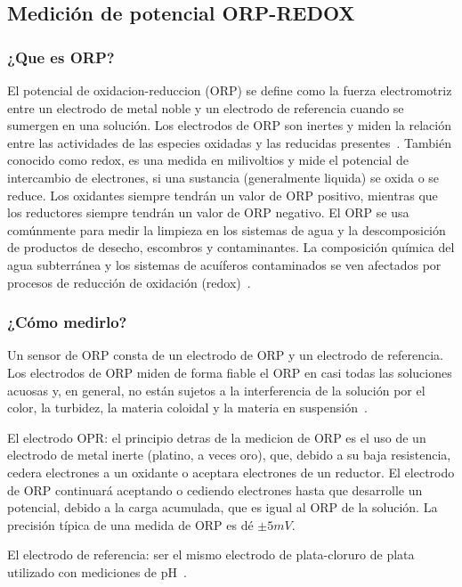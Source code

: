 \subsection{Medición de potencial ORP-REDOX}
\subsubsection{¿Que es ORP?}
El potencial de oxidacion-reduccion (ORP) se define como la fuerza electromotriz entre un electrodo de metal noble y un electrodo de referencia cuando se sumergen en una solución.
Los electrodos de ORP son inertes y miden la relación entre las actividades de las especies oxidadas y las reducidas presentes~\cite{d19_committee_test_nodate}.
También conocido como redox, es una medida en milivoltios y mide el potencial de intercambio de electrones, si una sustancia (generalmente liquida) se oxida o se reduce. 
Los oxidantes siempre tendrán un valor de ORP positivo, mientras que los reductores siempre tendrán un valor de ORP negativo. 
El ORP se usa comúnmente para medir la limpieza en los sistemas de agua y la descomposición de productos de desecho, escombros y contaminantes. 
La composición química del agua subterránea y los sistemas de acuíferos contaminados se ven afectados por procesos de reducción de oxidación (redox)~\cite{wator_redox_2020}.

\subsubsection{¿Cómo medirlo?}
Un sensor de ORP consta de un electrodo de ORP y un electrodo de referencia.
Los electrodos de ORP miden de forma fiable el ORP en casi todas las soluciones acuosas y, en general, no están sujetos a la interferencia de la solución por el color, la turbidez, la materia coloidal y la materia en suspensión~\cite{d19_committee_test_nodate}.

El electrodo OPR: el principio detras de la medicion de ORP es el uso de un electrodo de metal inerte (platino, a veces oro), que, debido a su baja resistencia, cedera electrones a un oxidante o aceptara electrones de un reductor. 
El electrodo de ORP continuará aceptando o cediendo electrones hasta que desarrolle un potencial, debido a la carga acumulada, que es igual al ORP de la solución. 
La precisión típica de una medida de ORP es d\'e \( \pm5 mV\).

El electrodo de referencia:  ser el mismo electrodo de plata-cloruro de plata utilizado con mediciones de pH~\cite{li_chapter_2019}.

